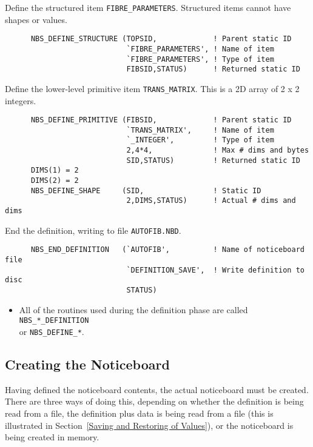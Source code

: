 Define the structured item {\tt FIBRE\_PARAMETERS}. Structured items cannot
have shapes or values.

\begin {verbatim}
      NBS_DEFINE_STRUCTURE (TOPSID,             ! Parent static ID
                            `FIBRE_PARAMETERS', ! Name of item
                            `FIBRE_PARAMETERS', ! Type of item
                            FIBSID,STATUS)      ! Returned static ID
\end{verbatim}

Define the lower-level primitive item {\tt TRANS\_MATRIX}. This is a 2D array
of 2 x 2 integers.

\begin {verbatim}
      NBS_DEFINE_PRIMITIVE (FIBSID,             ! Parent static ID
                            `TRANS_MATRIX',     ! Name of item
                            `_INTEGER',         ! Type of item
                            2,4*4,              ! Max # dims and bytes
                            SID,STATUS)         ! Returned static ID
      DIMS(1) = 2
      DIMS(2) = 2
      NBS_DEFINE_SHAPE     (SID,                ! Static ID
                            2,DIMS,STATUS)      ! Actual # dims and dims
\end{verbatim}

End the definition, writing to file {\tt AUTOFIB.NBD}.

\begin {verbatim}
      NBS_END_DEFINITION   (`AUTOFIB',          ! Name of noticeboard file
                            `DEFINITION_SAVE',  ! Write definition to disc
                            STATUS)
\end{verbatim}

\begin {itemize}
\item All of the routines used during the definition phase are called
{\tt NBS\_*\_DEFINITION} \\
or {\tt NBS\_DEFINE\_*}.
\end {itemize}

\subsection {Creating the Noticeboard}

Having defined the noticeboard contents, the actual noticeboard must be
created. There are three ways of doing this, depending on whether the
definition is being read from a file, the definition plus data is being read
from a file (this is illustrated in Section~\ref {Saving and Restoring of
Values}), or the noticeboard is being created in memory.

